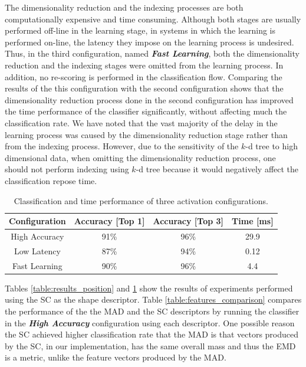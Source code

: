 The dimensionality reduction and the indexing processes are both computationally expensive and time consuming. 
Although both stages are usually performed off-line in the learning stage, in systems in which the learning is performed on-line, the latency they impose on the learning process is undesired.
Thus, in the third configuration, named \textbf{\emph{Fast Learning}}, both the dimensionality reduction and the indexing stages were omitted from the learning process.
In addition, no re-scoring is performed in the classification flow.
Comparing the results of the this configuration with the second configuration shows that the dimensionality reduction process done in the second configuration has improved the time performance of the classifier significantly, without affecting much the classification rate.
We have noted that the vast majority of the delay in the learning process was caused by the dimensionality reduction stage rather than from the indexing process.
However, due to the sensitivity of the $k$-d tree to high dimensional data, when omitting the dimensionality reduction process, one should not perform indexing using $k$-d tree because it would negatively affect the classification repose time.

\begin{table}
\centering
\caption{Classification and time performance of three activation configurations.}
\renewcommand{\arraystretch}{1.2}
\begin{tabular}{ c c c c }
  \toprule
  \textbf{Configuration}  & \textbf{Accuracy [Top 1]}  & \textbf{Accuracy [Top 3]} & \textbf{Time [ms]}\\
  \midrule
  High Accuracy & 91\% & 96\% & 29.9 \\ 
  Low Latency   & 87\% & 94\% & 0.12 \\
  Fast Learning & 90\% & 96\% & 4.4 \\ 
  \bottomrule
\end{tabular}
\label{table:configurations} 
\end{table}

Tables \ref{table:results_position} and \ref{table:configurations} show the results of experiments performed using the SC as the shape descriptor.
Table \ref{table:features_comparison} compares the performance of the the MAD and the SC descriptors by running the classifier in the \textbf{\emph{High Accuracy}} configuration using each descriptor.
One possible reason the SC achieved higher classification rate that the MAD is that vectors produced by the SC, in our implementation, has the same overall mass and thus the EMD is a metric, unlike the feature vectors produced by the MAD.

